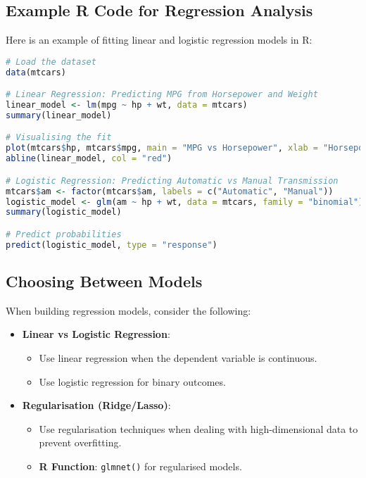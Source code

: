 \subsection{Example R Code for Regression Analysis}
Here is an example of fitting linear and logistic regression models in R:

\begin{lstlisting}[language=R, caption=Regression Analysis in R]
# Load the dataset
data(mtcars)

# Linear Regression: Predicting MPG from Horsepower and Weight
linear_model <- lm(mpg ~ hp + wt, data = mtcars)
summary(linear_model)

# Visualising the fit
plot(mtcars$hp, mtcars$mpg, main = "MPG vs Horsepower", xlab = "Horsepower", ylab = "MPG")
abline(linear_model, col = "red")

# Logistic Regression: Predicting Automatic vs Manual Transmission
mtcars$am <- factor(mtcars$am, labels = c("Automatic", "Manual"))
logistic_model <- glm(am ~ hp + wt, data = mtcars, family = "binomial")
summary(logistic_model)

# Predict probabilities
predict(logistic_model, type = "response")
\end{lstlisting}

\subsection{Choosing Between Models}
When building regression models, consider the following:

\begin{itemize}
    \item \textbf{Linear vs Logistic Regression}:
    \begin{itemize}
        \item Use linear regression when the dependent variable is continuous.
        \item Use logistic regression for binary outcomes.
    \end{itemize}
    \item \textbf{Regularisation (Ridge/Lasso)}:
    \begin{itemize}
        \item Use regularisation techniques when dealing with high-dimensional data to prevent overfitting.
        \item \textbf{R Function}: \texttt{glmnet()} for regularised models.
    \end{itemize}
\end{itemize}

